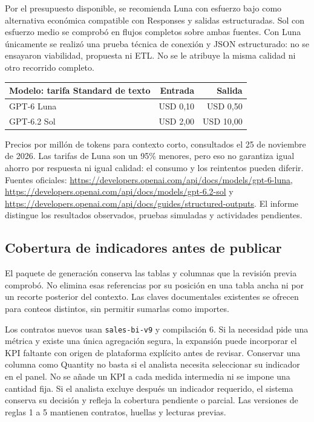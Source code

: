 \documentclass[11pt,letterpaper]{article}
\newcommand{\file}[1]{\texttt{#1}}
\begin{document}
Por el presupuesto disponible, se recomienda Luna con esfuerzo bajo como alternativa
económica compatible con Responses y salidas estructuradas. Sol con esfuerzo medio
se comprobó en flujos completos sobre ambas fuentes. Con Luna únicamente se realizó
una prueba técnica de conexión y JSON estructurado: no se ensayaron viabilidad,
propuesta ni ETL. No se le atribuye la misma calidad ni otro recorrido completo.

\begin{tabularx}{\textwidth}{@{}Xrr@{}}
  \toprule
  \textbf{Modelo: tarifa Standard de texto} & \textbf{Entrada} & \textbf{Salida} \\
  \midrule
  GPT-6 Luna & USD 0,10 & USD 0,50 \\
  GPT-6.2 Sol & USD 2,00 & USD 10,00 \\
  \bottomrule
\end{tabularx}

Precios por millón de tokens para contexto corto, consultados el 25 de noviembre
de 2026. Las tarifas de Luna son un 95\% menores, pero eso no garantiza igual ahorro
por respuesta ni igual calidad: el consumo y los reintentos pueden diferir.
Fuentes oficiales:
\url{https://developers.openai.com/api/docs/models/gpt-6-luna},
\url{https://developers.openai.com/api/docs/models/gpt-6.2-sol} y
\url{https://developers.openai.com/api/docs/guides/structured-outputs}.
El informe  distingue los
resultados observados, pruebas simuladas y actividades pendientes.


\subsection{Cobertura de indicadores antes de publicar}

El paquete de generación conserva las tablas y columnas que la revisión previa
comprobó. No elimina esas referencias por su posición en una tabla ancha ni por
un recorte posterior del contexto. Las claves documentales existentes se ofrecen
para conteos distintos, sin permitir sumarlas como importes.

Los contratos nuevos usan \file{sales-bi-v9} y compilación 6. Si la necesidad pide
una métrica y existe una única agregación segura, la expansión puede incorporar
el KPI faltante con origen de plataforma explícito antes de revisar. Conservar
una columna como Quantity no basta si el analista necesita seleccionar su indicador
en el panel. No se añade un KPI a cada medida intermedia ni se impone una cantidad
fija. Si el analista excluye después un indicador requerido, el sistema conserva
su decisión y refleja la cobertura pendiente o parcial. Las versiones de reglas
1 a 5 mantienen contratos, huellas y lecturas previas.
\end{document}
